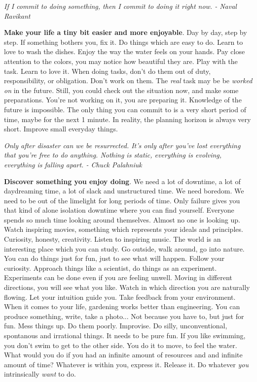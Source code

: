 \documentclass[a4paper,hidelinks]{article}
\begin{document}
\newpage

\begin{center}
\textit{If I commit to doing something, then I commit to doing it right now. - Naval Ravikant}
\end{center}

\textbf{Make your life a tiny bit easier and more enjoyable}.
Day by day, step by step.
If something bothers you, fix it.
Do things which are easy to do.
Learn to love to wash the dishes.
Enjoy the way the water feels on your hands.
Pay close attention to the colors, you may notice how beautiful they are.
Play with the task.
Learn to love it.
When doing tasks, don't do them out of duty, responsibility, or obligation.
Don't work on them.
The \textit{real} task may be be \textit{worked on} in the future.
Still, you could check out the situation now, and make some preparations.
You're not working on it, you are preparing it.
Knowledge of the future is impossible.
The only thing you can commit to is a very short period of time, maybe for the next 1 minute.
In reality, the planning horizon is always very short.
Improve small everyday things.

\newpage

\begin{center}
\textit{Only after disaster can we be resurrected. It's only after you've lost everything that you're free to do anything. Nothing is static, everything is evolving, everything is falling apart. - Chuck Palahniuk}
\end{center}

\textbf{Discover something you enjoy doing}.
We need a lot of downtime, a lot of daydreaming time, a lot of slack and unstructured time.
We need boredom.
We need to be out of the limelight for long periods of time.
Only failure gives you that kind of alone isolation downtime where you can find yourself.
Everyone spends so much time looking around themselves.
Almost no one is looking up.
Watch inspiring movies, something which represents your ideals and principles.
Curiosity, honesty, creativity.
Listen to inspiring music.
The world is an interesting place which you can study.
Go outside, walk around, go into nature.
You can do things just for fun, just to see what will happen.
Follow your curiosity.
Approach things like a scientist, do things as an experiment.
Experiments can be done even if you are feeling unwell.
Moving in different directions, you will see what you like.
Watch in which direction you are naturally flowing.
Let your intuition guide you.
Take feedback from your environment.
When it comes to your life, gardening works better than engineering.
You can produce something, write, take a photo...
Not because you have to, but just for fun.
Mess things up.
Do them poorly.
Improvise.
Do silly, unconventional, spontanous and irrational things.
It needs to be pure fun.
If you like swimming, you don't swim to get to the other side.
You do it to move, to feel the water.
What would you do if you had an infinite amount of resources and and infinite amount of time?
Whatever is within you, express it.
Release it.
Do whatever \textit{you} intrinsically \textit{want} to do.
\end{document}
